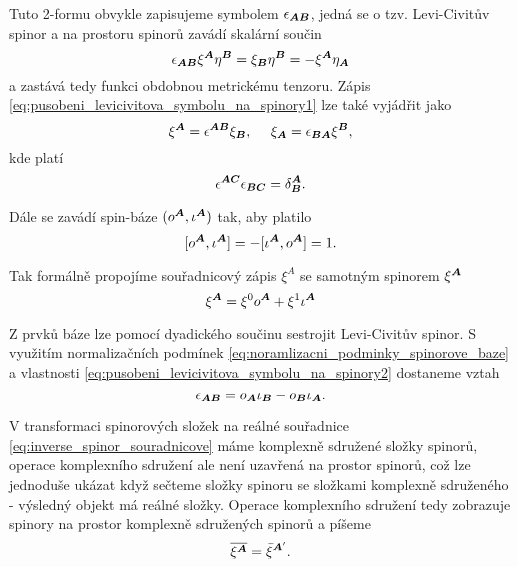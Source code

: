 Tuto 2-formu obvykle zapisujeme symbolem $\epsilon_{{\boldsymbol{A}} {\boldsymbol{B}}}$, jedná se o tzv. Levi-Civitův spinor a na prostoru
spinorů zavádí skalární součin
\begin{equation}
    \label{eq:pusobeni_levicivitova_symbolu_na_spinory1}
    \epsilon_{{\boldsymbol{A}} {\boldsymbol{B}}} \xi^{\boldsymbol{A}} \eta^{\boldsymbol{B}} = \xi_{\boldsymbol{B}} \eta^{\boldsymbol{B}} = -\xi^{\boldsymbol{A}}\eta_{\boldsymbol{A}}
\end{equation}
a zastává tedy funkci obdobnou metrickému tenzoru. Zápis \ref{eq:pusobeni_levicivitova_symbolu_na_spinory1} lze
také vyjádřit jako
\begin{equation}
    \label{eq:pusobeni_levicivitova_symbolu_na_spinory2}
    \xi^{\boldsymbol{A}} = \epsilon^{{\boldsymbol{A}}{\boldsymbol{B}}} \xi_{\boldsymbol{B}}, ~~~~ \xi_{\boldsymbol{A}} = \epsilon_{{\boldsymbol{B}}{\boldsymbol{A}}} \xi^{\boldsymbol{B}},
\end{equation}
kde platí
\begin{equation}
    \epsilon^{{\boldsymbol{A}}{\boldsymbol{C}}} \epsilon_{{\boldsymbol{B}}{\boldsymbol{C}}} = \delta_{\boldsymbol{B}}^{\boldsymbol{A}}.
\end{equation}

Dále se zavádí spin-báze $(o^{\boldsymbol{A}}, \iota^{\boldsymbol{A}})$ tak, aby platilo
\begin{equation}
    \label{eq:noramlizacni_podminky_spinorove_baze}
    [o^{\boldsymbol{A}}, \iota^{\boldsymbol{A}}] = -[\iota^{\boldsymbol{A}}, o^{\boldsymbol{A}}] = 1.
\end{equation}

Tak formálně propojíme souřadnicový zápis $\xi^A$ se samotným spinorem $\xi^{\boldsymbol{A}}$
\begin{equation}
    \xi^{\boldsymbol{A}} = \xi^0 o^{\boldsymbol{A}} + \xi^1 \iota^{\boldsymbol{A}}
\end{equation}

Z prvků báze lze pomocí dyadického součinu sestrojit Levi-Civitův spinor. S využitím normalizačních podmínek
\ref{eq:noramlizacni_podminky_spinorove_baze} a vlastnosti \ref{eq:pusobeni_levicivitova_symbolu_na_spinory2}
dostaneme vztah
\begin{equation}
    \epsilon_{{\boldsymbol{A}}{\boldsymbol{B}}} = o_{\boldsymbol{A}} \iota_{\boldsymbol{B}} - o_{\boldsymbol{B}} \iota_{\boldsymbol{A}}.
\end{equation}

V transformaci spinorových složek na reálné souřadnice \ref{eq:inverse_spinor_souradnicove} máme komplexně
sdružené složky spinorů, operace komplexního sdružení ale není uzavřená na prostor spinorů, což lze jednoduše
ukázat když sečteme složky spinoru se složkami komplexně sdruženého - výsledný objekt má reálné složky.
Operace komplexního sdružení tedy zobrazuje spinory na prostor komplexně sdružených spinorů a píšeme
\begin{equation}
    \overline{\xi^{\boldsymbol{A}}} = \bar{\xi}^{{\boldsymbol{A}}'}.
\end{equation}

